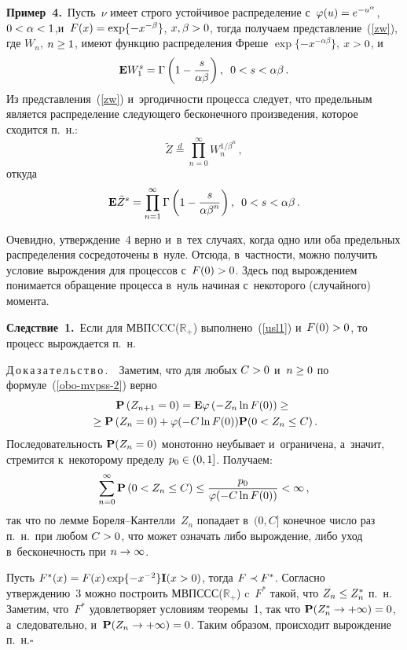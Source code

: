 \begin{multicols}{2}
\smallskip

\noindent
\textbf{Пример~4.}\ Пусть~$\nu$ имеет строго устойчивое рас\-пре\-де\-ле\-ние с~$\varphi(u)
\hm=e^{-u^\alpha}$,
$0\hm<\alpha\hm<1$,\linebreak и~$F(x)\hm=\exp\{-x^{-\beta}\}$, $x,\beta\hm>0$,
 тогда получаем пред\-став\-ле\-ние~(\ref{zw}), где $W_n$, $n\hm\ge 1$, 
 име\-ют функцию распределения Фреше $\exp\{-x^{-\alpha\beta}\}$, $x\hm>0$, и~$$
{\bf E}W_1^s=\Gamma\left(1-\displaystyle\frac{\displaystyle s\mathstrut}{\displaystyle \alpha\beta\mathstrut}\right),\enskip 0<s<\alpha\beta\,.
$$
Из представления~(\ref{zw}) и~эргодичности процесса следует, что предельным является
распределение сле\-ду\-юще\-го бесконечного произведения, которое сходится п.~н.:
$$
{\tilde Z}\stackrel{d}{=}\prod\limits_{n=0}^\infty W_n^{1/\beta^n}\,,
$$
откуда
$$
{\bf E}{\tilde Z}^s=\prod\limits_{n=1}^\infty \Gamma\left(1-\displaystyle\frac{\displaystyle s\mathstrut}{\displaystyle \alpha\beta^n\mathstrut}
\right),\enskip 0<s<\alpha\beta\,.
$$

Очевидно, утверж\-де\-ние~4 верно и~в~тех случаях, когда одно или оба предельных
распределения со\-сре\-до\-то\-че\-ны в~нуле. Отсюда, в~частности, можно получить условие вырождения
для процессов с~$F(0)\hm>0$. Здесь под вы\-рож\-де\-ни\-ем понимается обращение процесса в~нуль
начиная с~некоторого (случайного) момента.

\smallskip

\noindent
\textbf{Следствие~1.}\ 
Если для МВПCCC($\mathbb{R}_+$) выполнено~(\ref{usl1}) 
и~$F(0)\hm>0$, то процесс вырождается п.~н.


\noindent
Д\,о\,к\,а\,з\,а\,т\,е\,л\,ь\,с\,т\,в\,о\,.\ \
Заметим, что для любых $C\hm>0$ и~$n\hm\ge 0$ по формуле~(\ref{obo-mvpss-2}) верно
\begin{multline*}
{\bf P}\left(Z_{n+1}=0\right)={\bf E}\varphi\left(-Z_n\ln F(0)\right)\ge{}\\
{}\ge
{\bf P}\left(Z_n=0\right)+\varphi(-C\ln F(0)){\bf P}(0<Z_n\le C)\,.
\end{multline*}
Последовательность ${\bf P}(Z_n\hm=0)$ монотонно неубывает и~ограничена,
а~значит, стремится к~некоторому пределу $p_0\hm\in (0,1]$. Получаем:
$$
\sum\limits_{n=0}^\infty{\bf P}\left(0<Z_n\le C\right)\le 
\displaystyle\frac{\displaystyle p_0\mathstrut}{\displaystyle \varphi(-C\ln F(0))\mathstrut}<\infty\,,
$$
так что по лемме Бо\-ре\-ля--Кан\-тел\-ли~$Z_n$ попадает в~$(0,C]$ ко\-неч\-ное
чис\-ло раз п.~н.\  при любом $C\hm>0$, что может означать либо вы\-рож\-де\-ние,
либо уход в~бес\-ко\-неч\-ность при $n\hm\to\infty$.

Пусть $F^*(x)\hm=F(x)\exp\{-x^{-2}\}{\bf I}(x\hm>0)$,
тогда $F\hm\prec F^*$. Согласно утверж\-де\-нию~3
мож\-но по\-стро\-ить МВПССС($\mathbb{R}_+$) c~$F^*$ такой, что $Z_n\hm\le Z^*_n$ п.~н.
Заметим, что~$F^*$ удовле\-тво\-ря\-ет условиям тео\-ре\-мы~1, так что
${\bf P}(Z^*_n\hm\to\hm+\infty)\hm=0$, а~следовательно, и~${\bf P}(Z_n\hm\to+\infty)\hm=0$.
Таким образом, происходит вы\-рож\-де\-ние п.~н.\hfill$\square$


\end{multicols}
